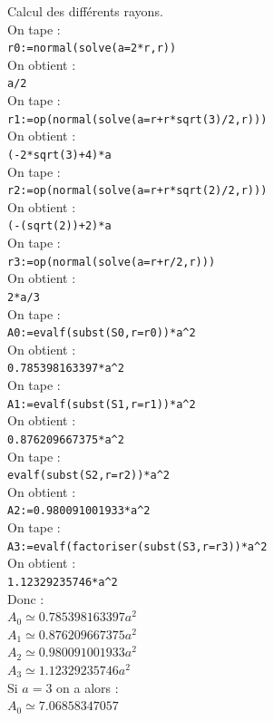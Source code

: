 \documentclass[a4paper,11pt]{book}
\begin{document}
Calcul des diff\'erents rayons.\\
On tape :\\
{\tt r0:=normal(solve(a=2*r,r))}\\
On obtient :\\
{\tt a/2}\\
On tape :\\
{\tt r1:=op(normal(solve(a=r+r*sqrt(3)/2,r)))}\\
On obtient :\\
{\tt (-2*sqrt(3)+4)*a}\\
On tape :\\
{\tt r2:=op(normal(solve(a=r+r*sqrt(2)/2,r)))}\\
On obtient :\\
{\tt (-(sqrt(2))+2)*a}\\
On tape :\\
{\tt r3:=op(normal(solve(a=r+r/2,r)))}\\
On obtient :\\
{\tt 2*a/3}\\
On tape :\\
{\tt A0:=evalf(subst(S0,r=r0))*a\verb|^|2}\\
On obtient :\\
{\tt 0.785398163397*a\verb|^|2}\\
On tape :\\
{\tt A1:=evalf(subst(S1,r=r1))*a\verb|^|2}\\
On obtient :\\
{\tt 0.876209667375*a\verb|^|2}\\
On tape :\\
{\tt evalf(subst(S2,r=r2))*a\verb|^|2}\\
On obtient :\\
{\tt A2:=0.980091001933*a\verb|^|2}\\
On tape :\\
{\tt A3:=evalf(factoriser(subst(S3,r=r3))*a\verb|^|2}\\
On obtient :\\
{\tt 1.12329235746*a\verb|^|2}\\
Donc :\\
$A_0\simeq 0.785398163397a^2$\\
$A_1\simeq 0.876209667375a^2$\\
$A_2\simeq 0.980091001933a^2$\\
$A_3\simeq 1.12329235746a^2$\\
Si $a=3$ on a alors :\\
$A_0\simeq 7.06858347057$\\
\end{document}
